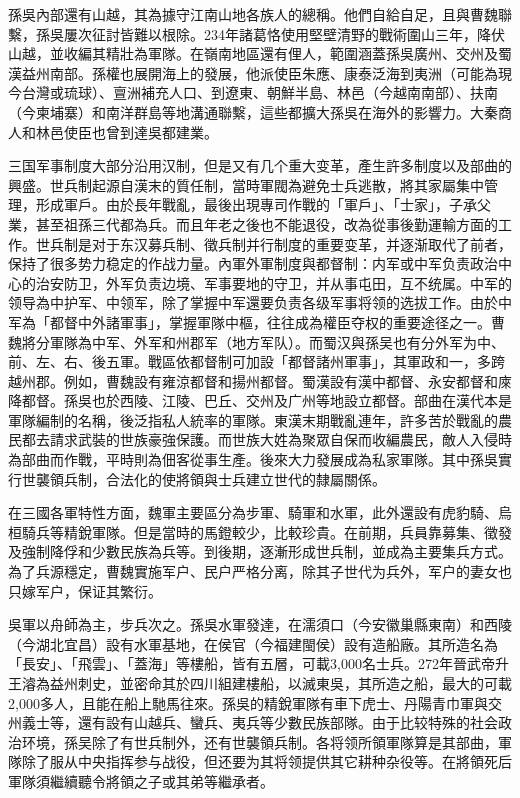 孫吳內部還有山越，其為據守江南山地各族人的總稱。他們自給自足，且與曹魏聯繫，孫吳屢次征討皆難以根除。234年諸葛恪使用堅壁清野的戰術圍山三年，降伏山越，並收編其精壯為軍隊。在嶺南地區還有俚人，範圍涵蓋孫吳廣州、交州及蜀漢益州南部。孫權也展開海上的發展，他派使臣朱應、康泰泛海到夷洲（可能為現今台灣或琉球）、亶洲補充人口、到遼東、朝鮮半島、林邑（今越南南部）、扶南（今柬埔寨）和南洋群島等地溝通聯繫，這些都擴大孫吳在海外的影響力。大秦商人和林邑使臣也曾到達吳都建業。

三国军事制度大部分沿用汉制，但是又有几个重大变革，產生許多制度以及部曲的興盛。世兵制起源自漢末的質任制，當時軍閥為避免士兵逃散，將其家屬集中管理，形成軍戶。由於長年戰亂，最後出現專司作戰的「軍戶」、「士家」，子承父業，甚至祖孫三代都為兵。而且年老之後也不能退役，改為從事後勤運輸方面的工作。世兵制是对于东汉募兵制、徵兵制并行制度的重要变革，并逐渐取代了前者，保持了很多势力稳定的作战力量。內軍外軍制度與都督制：内军或中军负责政治中心的治安防卫，外军负责边境、军事要地的守卫，并从事屯田，互不统属。中军的领导為中护军、中领军，除了掌握中军還要负责各级军事将领的选拔工作。由於中军為「都督中外諸軍事」，掌握軍隊中樞，往往成為權臣夺权的重要途径之一。曹魏將分軍隊為中军、外军和州郡军（地方军队）。而蜀汉與孫吴也有分外军为中、前、左、右、後五軍。戰區依都督制可加設「都督諸州軍事」，其軍政和一，多跨越州郡。例如，曹魏設有雍涼都督和揚州都督。蜀漢設有漢中都督、永安都督和庲降都督。孫吳也於西陵、江陵、巴丘、交州及广州等地設立都督。部曲在漢代本是軍隊編制的名稱，後泛指私人統率的軍隊。東漢末期戰亂連年，許多苦於戰亂的農民都去請求武裝的世族豪強保護。而世族大姓為聚眾自保而收編農民，敵人入侵時為部曲而作戰，平時則為佃客從事生產。後來大力發展成為私家軍隊。其中孫吳實行世襲領兵制，合法化的使將領與士兵建立世代的隸屬關係。

在三國各軍特性方面，魏軍主要區分為步軍、騎軍和水軍，此外還設有虎豹騎、烏桓騎兵等精銳軍隊。但是當時的馬鐙較少，比較珍貴。在前期，兵員靠募集、徵發及強制降俘和少數民族為兵等。到後期，逐漸形成世兵制，並成為主要集兵方式。為了兵源穩定，曹魏實施军户、民户严格分离，除其子世代为兵外，军户的妻女也只嫁军户，保证其繁衍。

吳軍以舟師為主，步兵次之。孫吳水軍發達，在濡須口（今安徽巢縣東南）和西陵（今湖北宜昌）設有水軍基地，在侯官（今福建閩侯）設有造船廠。其所造名為「長安」、「飛雲」、「蓋海」等樓船，皆有五層，可載3,000名士兵。272年晉武帝升王濬為益州刺史，並密命其於四川組建樓船，以滅東吳，其所造之船，最大的可載2,000多人，且能在船上馳馬往來。孫吳的精銳軍隊有車下虎士、丹陽青巾軍與交州義士等，還有設有山越兵、蠻兵、夷兵等少數民族部隊。由于比较特殊的社会政治环境，孫吴除了有世兵制外，还有世襲領兵制。各将领所領軍隊算是其部曲，軍隊除了服从中央指挥参与战役，但还要为其将领提供其它耕种杂役等。在將領死后軍隊須繼續聽令將領之子或其弟等繼承者。

